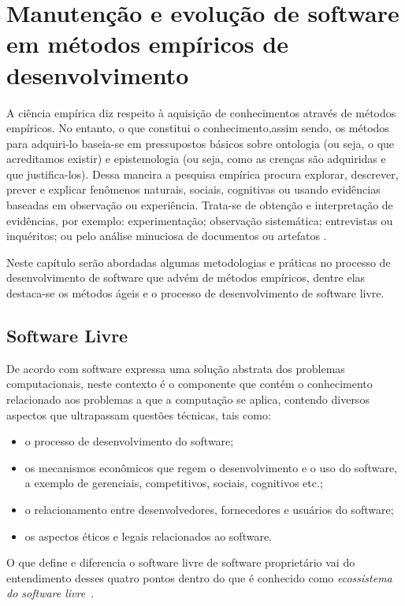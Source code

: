 \section{Manutenção e evolução de software em métodos empíricos de desenvolvimento}

A ciência empírica diz respeito à aquisição de conhecimentos através de métodos empíricos. No entanto, o que constitui o conhecimento,assim sendo, os métodos para adquiri-lo baseia-se em pressupostos básicos sobre ontologia (ou seja, o que acreditamos existir) e epistemologia (ou seja, como as crenças são adquiridas e que justifica-los). Dessa maneira a pesquisa empírica procura explorar, descrever, prever e explicar fenômenos naturais, sociais, cognitivas ou usando evidências baseadas em observação ou experiência. Trata-se de obtenção e interpretação de evidências, por exemplo: experimentação; observação sistemática; entrevistas ou inquéritos; ou pelo análise minuciosa de documentos ou artefatos \cite{sjoberg2007future}.

Neste capítulo serão abordadas algumas metodologias e práticas no processo de desenvolvimento de software que advém de métodos empíricos, dentre elas destaca-se os métodos ágeis e o processo de desenvolvimento de software livre.

\subsection{Software Livre}
\label{soft-livre}

De acordo com  software expressa uma solução abstrata dos problemas computacionais, neste contexto é o componente que contém o conhecimento relacionado aos problemas a que a computação se aplica, contendo diversos aspectos que ultrapassam questões técnicas, tais como:
\begin{itemize}
\item o processo de desenvolvimento do software;
\item os mecanismos econômicos que regem o desenvolvimento e o uso do software, a exemplo de gerenciais, competitivos, sociais, cognitivos etc.;
\item o relacionamento entre desenvolvedores, fornecedores e usuários do software;
\item os aspectos éticos e legais relacionados ao software.
\end{itemize}

O que define e diferencia o software livre de software proprietário vai do entendimento desses quatro pontos dentro do que é conhecido como \textit{ecossistema do software livre}~\cite{meirelles2013}.

